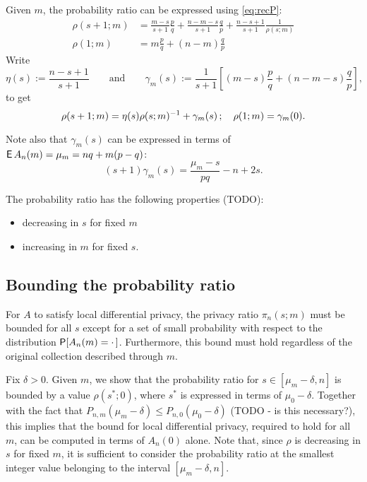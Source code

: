 \documentclass[11pt]{article}
\begin{document}
Given $m$, the probability ratio can be expressed using \eqref{eq:recP}:
\begin{align*}
\rho(s+1;m) &= \frac{m-s}{s+1}\frac{p}{q} + \frac{n-m-s}{s+1}\frac{q}{p} + \frac{n-s+1}{s+1} \frac{1}{\rho(s;m)} \\
\rho(1;m) &= m\frac{p}{q} + (n-m)\frac{q}{p}
\end{align*}
Write
\[ \eta(s) := \frac{n-s+1}{s+1} \qquad\text{and}\qquad
\gamma_m(s) := \frac{1}{s+1} \left[(m-s)\frac{p}{q} + (n-m-s)\frac{q}{p}\right], \]
to get
\begin{equation}\label{eq:probrrec}
\rho(s+1;m) = \eta(s)\inv{\rho(s;m)} + \gamma_m(s)\,; \quad
\rho(1;m) = \gamma_m(0). 
\end{equation}

Note also that $\gamma_m(s)$ can be expressed in terms of
$\EP A_n(m) = \mu_m = nq + m(p-q)$:
\[ (s+1)\gamma_m(s) = \frac{\mu_m - s}{pq} - n + 2s. \]

The probability ratio has the following properties (TODO):
\begin{itemize}
\item decreasing in $s$ for fixed $m$
\item increasing in $m$ for fixed $s$.
\end{itemize}

\subsection{Bounding the probability ratio}

For $A$ to satisfy local differential privacy, the privacy ratio $\pi_n(s;m)$
must be bounded for all $s$ except for a set of small probability with respect
to the distribution $\P[A_n(m) = \cdot\,]$.
Furthermore, this bound must hold regardless of the original collection
described through $m$.

Fix $\delta > 0$.
Given $m$, we show that the probability ratio for $s\in[\mu_m-\delta, n]$ 
is bounded by a value $\rho(s^*; 0)$, where $s^*$ is expressed in terms of
$\mu_0-\delta$.
Together with the fact that
$P_{n,m}(\mu_m - \delta) \leq P_{n,0}(\mu_0 - \delta)$ (TODO - is this
necessary?),
this implies that the bound for local differential privacy, required to hold
for all $m$, can be computed in terms of $A_n(0)$ alone.
Note that, since $\rho$ is decreasing in $s$ for fixed $m$, it is sufficient
to consider the probability ratio at the smallest integer value belonging to
the interval $[\mu_m-\delta, n]$.
\end{document}
